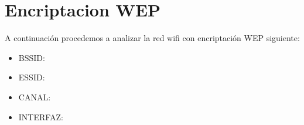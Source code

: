 \section{Encriptacion WEP}

A continuación procedemos a analizar la red wifi con encriptación WEP siguiente:\\

\begin{itemize}
        \item BSSID: 
        \item ESSID: 
        \item CANAL: 
        \item INTERFAZ: 
\end{itemize}

